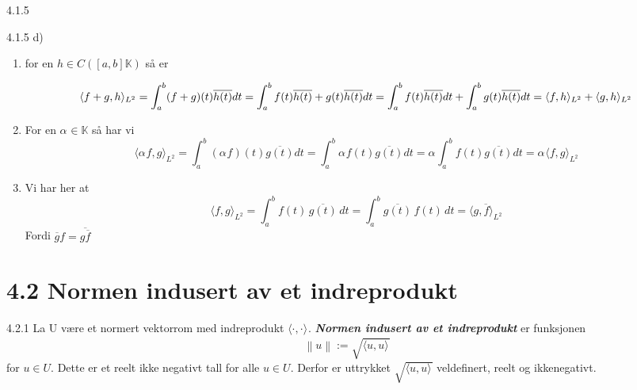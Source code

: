 \documentclass[a4paper,norsk]{article}
\renewcommand{\geq}{\geqslant}
\begin{document}
\begin{oppgavebox}{4.1.5}{}
\begin{proofbox}{4.1.5 d)}{}
\begin{enumerate}
        Dette er åpenbart $ \geq 0 $ og $ =0 \Longleftrightarrow f(t) = 0 \forall t \in \left[ a, b \right]  $ 
        
        \item for en $ h \in C \left(  \left[ a, b \right] \mathbb{K} \right)  $ så er 
        
        \[
            \langle f+g, h \rangle_{ L^2 } = \int_{a}^{b} (f+g)(t) \overline{h(t)} dt 
            = \int_{a}^{b} f(t) \overline{h(t)} + g(t) \overline{h(t)} dt 
            = \int_{a}^{b} f(t) \overline{h(t)}dt + \int_{a}^{b} g(t) \overline{h(t)}dt \\
            = \langle f, h \rangle_{ L^2 } + \langle g, h \rangle_{ L^2 } 
        \]
        


        \item For en $ \alpha_{}^{} \in \mathbb{K} $ så har vi
        \[
            \langle \alpha_{}^{} f, g \rangle_{ L^2 } = \int_{a}^{b} \left( \alpha_{}^{} f \right)(t) \overline{g(t)}dt 
            =  \int_{a}^{b} \alpha_{}^{} f(t) \overline{g(t)}dt 
            = \alpha_{}^{} \int_{a}^{b} f(t) \overline{g(t)}dt 
            = \alpha_{}^{} \langle f, g \rangle_{ L^2 } 
        \]
        

        \item Vi har her at 
        \[
            \langle f, g \rangle_{L^2} 
                = \int_a^b f(t)\,\overline{g(t)}\,dt 
                = \int_a^b \overline{g(t)}\,f(t)\,dt 
                = \overline{\langle g, f \rangle_{L^2}}
        \]  
        Fordi $ \overline{g} f = \overline{g \overline{f}} $
    \end{enumerate}
\end{proofbox}
\end{oppgavebox}

\section*{4.2 Normen indusert av et indreprodukt}

\begin{definitionbox}{4.2.1}{}
La U være et normert vektorrom med indreprodukt $ \langle \cdot, \cdot \rangle_{  }  $. \textbf{\textit{Normen indusert av et indreprodukt}} er funksjonen 
\[
    \left\lVert u \right\rVert := \sqrt{ \langle u, u \rangle_{  }  }
\]
for $ u \in U $. Dette er et reelt ikke negativt tall for alle $ u \in  U $. Derfor er uttrykket $ \sqrt{ \langle u, u \rangle_{  }  } $ veldefinert, reelt og ikkenegativt. 
\end{definitionbox}
\end{document}
